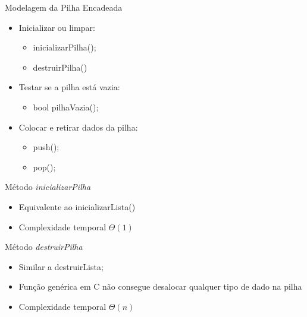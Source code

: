 \documentclass[12pt,table,xcolor={dvipsnames}]{beamer}
\begin{document}
\begin{frame}[fragile]{Modelagem da Pilha Encadeada}

\begin{itemize}
\item Inicializar ou limpar:
\begin{itemize}
\item inicializarPilha();
\item destruirPilha()
\end{itemize}
\item Testar se a pilha está vazia:
\begin{itemize}
\item bool pilhaVazia();
\end{itemize}
\item Colocar e retirar dados da pilha:
\begin{itemize}
\item push();
\item pop();
\end{itemize}
\end{itemize}
\end{frame}

\begin{frame}[fragile]{Método \textit{inicializarPilha}}
 \begin{itemize}
  \item Equivalente ao inicializarLista()
  \item Complexidade temporal $\Theta(1)$
 \end{itemize}
\end{frame}

\begin{frame}[fragile]{Método \textit{destruirPilha}}
 \begin{itemize}
  \item Similar a destruirLista;
  \item Função genérica em C não consegue desalocar qualquer tipo de dado na pilha
  \item Complexidade temporal $\Theta(n)$
 \end{itemize}
\end{frame}
\end{document}
